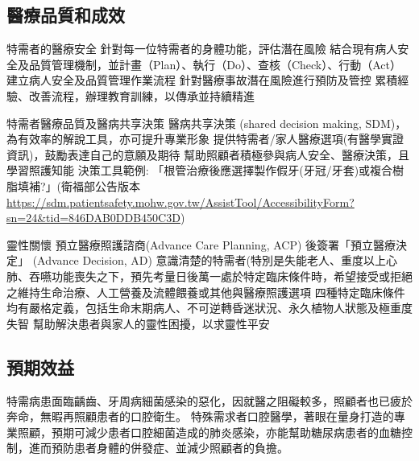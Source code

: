 
\subsection{醫療品質和成效}

\begin{outline}

\1 特需者的醫療安全
    \2 針對每一位特需者的身體功能，評估潛在風險
    \2 結合現有病人安全及品質管理機制，並計畫（Plan）、執行（Do）、查核（Check）、行動（Act）
	\2 建立病人安全及品質管理作業流程
	\2 針對醫療事故潛在風險進行預防及管控
	\2 累積經驗、改善流程，辦理教育訓練，以傳承並持續精進
	
\1 特需者醫療品質及醫病共享決策
    \2 醫病共享決策 (shared decision making, SDM)，為有效率的解說工具，亦可提升專業形象
    \2 提供特需者/家人醫療選項(有醫學實證資訊)，鼓勵表達自己的意願及期待
    \2 幫助照顧者積極參與病人安全、醫療決策，且學習照護知能
    \2 決策工具範例: 「根管治療後應選擇製作假牙(牙冠/牙套)或複合樹脂填補?」(衛福部公告版本 \url{https://sdm.patientsafety.mohw.gov.tw/AssistTool/AccessibilityForm?sn=24&tid=846DAB0DDB450C3D})
    
\1 靈性關懷
    \2 預立醫療照護諮商(Advance Care Planning, ACP) 後簽署「預立醫療決定」 (Advance Decision, AD)
    \2 意識清楚的特需者(特別是失能老人、重度以上心肺、吞嚥功能喪失之下，預先考量日後萬一處於特定臨床條件時，希望接受或拒絕之維持生命治療、人工營養及流體餵養或其他與醫療照護選項
    \2 四種特定臨床條件均有嚴格定義，包括生命末期病人、不可逆轉昏迷狀況、永久植物人狀態及極重度失智
    \2 幫助解決患者與家人的靈性困擾，以求靈性平安

\end{outline}

\subsection{預期效益}
特需病患面臨齲齒、牙周病細菌感染的惡化，因就醫之阻礙較多，照顧者也已疲於奔命，無暇再照顧患者的口腔衛生。
特殊需求者口腔醫學，著眼在量身打造的專業照顧，預期可減少患者口腔細菌造成的肺炎感染，亦能幫助糖尿病患者的血糖控制，進而預防患者身體的併發症、並減少照顧者的負擔。


